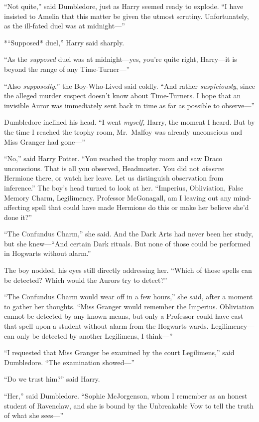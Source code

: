 ``Not quite,'' said Dumbledore, just as Harry seemed ready to explode.
``I have insisted to Amelia that this matter be given the utmost
scrutiny. Unfortunately, as the ill-fated duel was at midnight---''

*``Supposed* duel,'' Harry said sharply.

``As the \emph{supposed} duel was at midnight---yes, you're quite right,
Harry---it is beyond the range of any Time-Turner---''

``Also \emph{supposedly},'' the Boy-Who-Lived said coldly. ``And rather
\emph{suspiciously}, since the alleged murder suspect doesn't know about
Time-Turners. I hope that an invisible Auror was immediately sent back
in time as far as possible to observe---''

Dumbledore inclined his head. ``I went \emph{myself,} Harry, the moment
I heard. But by the time I reached the trophy room, Mr.~Malfoy was
already unconscious and Miss Granger had gone---''

``No,'' said Harry Potter. ``You reached the trophy room and saw Draco
unconscious. That is all you observed, Headmaster. You did not
\emph{observe} Hermione there, or watch her leave. Let us distinguish
observation from inference.'' The boy's head turned to look at her.
``Imperius, Obliviation, False Memory Charm, Legilimency. Professor
McGonagall, am I leaving out any mind-affecting spell that could have
made Hermione do this or make her believe she'd done it?''

``The Confundus Charm,'' she said. And the Dark Arts had never been her
study, but she knew---``And certain Dark rituals. But none of those
could be performed in Hogwarts without alarm.''

The boy nodded, his eyes still directly addressing her. ``Which of those
spells can be detected? Which would the Aurors try to detect?''

``The Confundus Charm would wear off in a few hours,'' she said, after a
moment to gather her thoughts. ``Miss Granger would remember the
Imperius. Obliviation cannot be detected by any known means, but only a
Professor could have cast that spell upon a student without alarm from
the Hogwarts wards. Legilimency---can only be detected by another
Legilimens, I think---''

``I requested that Miss Granger be examined by the court Legilimens,''
said Dumbledore. ``The examination showed---''

``Do we trust him?'' said Harry.

``Her,'' said Dumbledore. ``Sophie McJorgenson, whom I remember as an
honest student of Ravenclaw, and she is bound by the Unbreakable Vow to
tell the truth of what she sees---''

